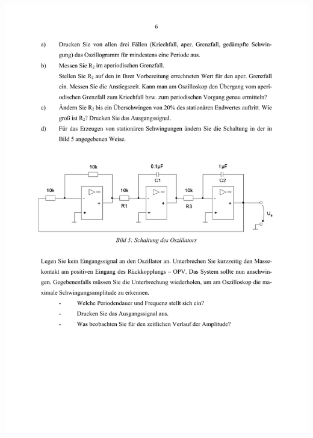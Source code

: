 \includegraphics[width=1.0\textwidth]{Bilder/Grundubertragungsglieder im Zeitbereich (verschoben) 6}\newpage
